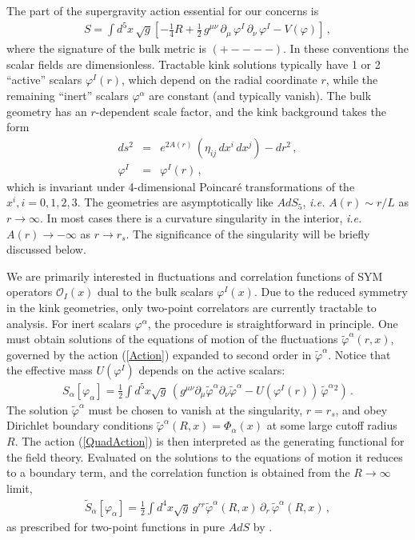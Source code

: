 \documentclass[a4paper,12pt]{article}
\def\varphit{\tilde{\varphi}}
\begin{document}
The part of the supergravity action essential for our concerns is
\begin{eqnarray}
\label{Action}
S = \int d^5x \, \sqrt{g} \left[ - \frac{1}{4} R + \frac{1}{2} \,
g^{\mu \nu} \, \partial_{\mu} \, \varphi^I \, \partial_{\nu} \,
\varphi^I - V(\varphi) \right] \,,
\end{eqnarray}
where the signature of the bulk metric is $(+----)$. In these
conventions the scalar fields are dimensionless.  Tractable kink
solutions typically have 1 or 2 ``active'' scalars $\varphi^I(r)$,
which depend on the radial coordinate $r$, while the remaining
``inert'' scalars $\varphi^\alpha$ are constant (and typically
vanish). The bulk geometry has an $r$-dependent scale factor, and the
kink background takes the form
\begin{eqnarray}
\label{Background}
ds^2 &=& e^{2 A(r)} \, (\eta_{ij} \, dx^i \, dx^j) - dr^2 \,, \\
\varphi^I &=& \varphi^I(r) \,, \nonumber
\end{eqnarray}
which is invariant under 4-dimensional Poincar\'e transformations of
the $x^i, i=0,1,2,3$. The geometries are asymptotically like $AdS_5$,
{\em i.e.}  $A(r) \sim r/L$ as $r \rightarrow \infty$. In most cases
there is a curvature singularity in the interior, {\em i.e.}
$A(r)\rightarrow -\infty$ as $r\rightarrow r_s$. The significance of
the singularity will be briefly discussed below.

We are primarily interested in fluctuations and correlation functions 
of SYM operators
${\mathcal O}_I(x)$ dual to the bulk scalars $\varphi^I(x)$.  Due to
the reduced symmetry in the kink geometries, only two-point
correlators are currently tractable to analysis.  For inert scalars
$\varphi^\alpha$, the procedure is straightforward in principle. One
must obtain solutions of the equations of motion of the fluctuations
$\tilde{\varphi}^\alpha(r,x)$, governed by the action (\ref{Action})
expanded to second order in $\varphit^\alpha$.  Notice that the
effective mass $U(\varphi^I)$ depends on the active scalars:
\begin{eqnarray}
\label{QuadAction}
S_\alpha[\varphi_\alpha] = \frac{1}{2} \int d^5x \sqrt{g} \, \left(
g^{\mu \nu} \partial_{\mu} \varphit^\alpha \partial_{\nu}
\varphit^\alpha - U(\varphi^I(r)) \, \varphit^\alpha{}^2 \right) \,.
\end{eqnarray}
The solution $\varphit^\alpha$ must be chosen to vanish at the
singularity, $r=r_s$, and obey Dirichlet boundary conditions
$\varphit^\alpha(R,x)=\Phi_\alpha(x)$ at some large cutoff radius
$R$. The action (\ref{QuadAction}) is then interpreted as the
generating functional for the field theory.  Evaluated on the
solutions to the equations of motion it reduces to a boundary term,
and the correlation function is obtained from the $R\rightarrow
\infty$ limit,
\begin{eqnarray}
\label{InertCorr}
\tilde{S}_\alpha[\varphi_\alpha] = \frac{1}{2} \int d^4x \sqrt{g} \,
g^{rr} \varphit^\alpha (R,x) \, \partial_r \, \varphit^\alpha (R,x)
\,,
\end{eqnarray}
as prescribed for two-point functions in pure $AdS$ by
\cite{gkp,fmmr}.
\end{document}
